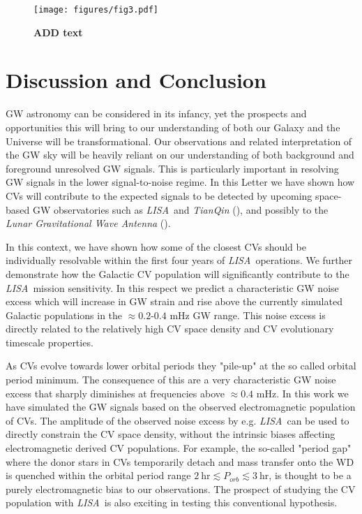 \documentclass[fleqn,usenatbib]{mnras}
\newcommand{\lisa}{{\it LISA}}
\begin{document}
\begin{figure}
	\texttt{[image: figures/fig3.pdf]}
    \caption{ \textbf{ADD text } }
    \label{fig:isd}
\end{figure}






\section{Discussion and Conclusion} \label{sec:discussion}

GW astronomy can be considered in its infancy, yet the prospects and opportunities this will bring to our understanding of both our Galaxy and the Universe will be transformational. Our observations and related interpretation of the GW sky will be heavily reliant on our understanding of both background and foreground unresolved GW signals. This is particularly important in resolving GW signals in the lower signal-to-noise regime. In this Letter we have shown how CVs will contribute to the expected signals to be detected by upcoming space-based GW observatories such as \lisa\ and \textit{TianQin} (\citealt{luo16}), and possibly to the \textit{Lunar Gravitational Wave Antenna} (\citealt{harms21}).  

In this context, we have shown how some of the closest CVs should be individually resolvable within the first four years of \lisa\ operations. We further demonstrate how the Galactic CV population will significantly contribute to the \lisa\ mission sensitivity. In this respect we predict a characteristic GW noise excess which will increase in GW strain and rise above the currently simulated Galactic populations in the $\approx 0.2$-$0.4$ mHz GW range. This noise excess is directly related to the relatively high CV space density and CV evolutionary timescale properties. 

As CVs evolve towards lower orbital periods they "pile-up" at the so called orbital period minimum. The consequence of this are a very characteristic GW noise excess that sharply diminishes at frequencies above $\approx 0.4$ mHz. 
In this work we have simulated the GW signals based on the observed electromagnetic population of CVs. The amplitude of the observed noise excess by e.g. \lisa\ can be used to directly constrain the CV space density, without the intrinsic biases affecting electromagnetic derived CV populations. For example, the so-called "period gap" where the donor stars in CVs temporarily detach and mass transfer onto the WD is quenched within the orbital period range $2~\mathrm{hr} \lesssim P_{orb} \lesssim 3~\mathrm{hr}$, is thought to be a purely electromagnetic bias to our observations. The prospect of studying the CV population with \lisa\ is also exciting in testing this conventional hypothesis.
\end{document}
